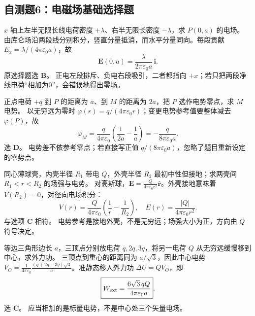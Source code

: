 
\subsection{自测题6：电磁场基础选择题}

\problemtext $x$ 轴上左半无限长线电荷密度 $+\lambda$、右半无限长密度 $-\lambda$，求 $P(0,a)$ 的电场。
\workings 由库仑场沿两段线分别积分，竖直分量抵消，而水平分量同向。每段贡献 $E_x=\lambda/(4\pi\varepsilon_0a)$，故
\[\boxed{\bm E(0,a)=\frac{\lambda}{2\pi\varepsilon_0a}\,\bm i}.\]
原选择题选 \textbf{B}。
\crosscheck 正电左段排斥、负电右段吸引，二者都指向 $+x$；若只把两段净线电荷“相加为0”，会错误地得出零场。

\problemtext 正点电荷 $+q$ 到 $P$ 的距离为 $a$、到 $M$ 的距离为 $2a$，把 $P$ 选作电势零点，求 $M$ 电势。
\workings 以无穷远为零时 $\varphi(r)=q/(4\pi\varepsilon_0r)$；变更电势参考值要整体减去 $\varphi(P)$，故
\[\boxed{\varphi_M=\frac{q}{4\pi\varepsilon_0}\left(\frac1{2a}-\frac1a\right)=-\frac{q}{8\pi\varepsilon_0 a}}.\]
选 \textbf{D}。
\crosscheck 电势差不依参考零点；若直接写正值 $q/(8\pi\varepsilon_0a)$，忽略了题目重新设定的零势点。

\problemtext 同心薄球壳，内壳半径 $R_1$ 带电 $Q$，外壳半径 $R_2$ 最初中性但接地；求两壳间 $R_1<r<R_2$ 的场强与电势。
\workings 对高斯球，$\bm E=\frac{Q}{4\pi\varepsilon_0r^2}\hat{\bm r}$。外壳接地意味着 $V(R_2)=0$，对径向电场积分：
\[\boxed{V(r)=\frac{Q}{4\pi\varepsilon_0}\left(\frac1r-\frac1{R_2}\right)},\quad \boxed{E(r)=\frac{|Q|}{4\pi\varepsilon_0r^2}}.\]
与选项 \textbf{C} 相符。
\crosscheck 电势参考是接地外壳，不是无穷远；场强大小为正，方向由 $Q$ 符号决定。

\problemtext 等边三角形边长 $a$，三顶点分别放电荷 $q,2q,3q$，将另一电荷 $Q$ 从无穷远缓慢移到中心，求外力功。
\workings 三顶点到重心的距离同为 $a/\sqrt3$，因此中心电势 $V_O=\frac{1}{4\pi\varepsilon_0}\frac{(q+2q+3q)\sqrt3}{a}$。准静态移入外力功 $\Delta U=QV_O$，即
\[\boxed{W_{\rm ext}=\frac{6\sqrt3\,qQ}{4\pi\varepsilon_0a}}.\]
选 \textbf{C}。
\crosscheck 应当相加的是标量电势，不是中心处三个矢量电场。

